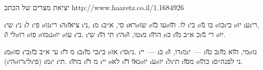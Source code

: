 יציאת מצרים של הכתב 
http://www.haaretz.co.il/1.1684926

\i{שי}  \i{ני} \i{ל} \i{פי} \o{נו}\i{רי} \i{ה}\i{צי}\u{או} \i{ני}, \i{מ} \i{סי},  א״ב \i{רא}\o{שו} \o{עו} \u{כו}\o{לו}. \u{הו} \i{בי}  \o{בּו} \u{נו} \o{כו}\i{בי}  \o{יו} \i{ע}\i{רי}, \i{לי} \u{ו}\o{רו} \o{פו} \o{מו}\i{נ}\o{יו}  \o{עו} \i{בי}. \i{שי} \i{תי} \u{הו}     \i{הי}\o{טו}, \u{ו}\i{מ} \i{ה}\u{חו} \o{כ} \i{כ} א״ב \u{מו}\i{רי} \u{נו} \o{יו}.

\i{מ}\o{סו}  \i{בי}\i{עי}   א״ב \u{בו} \i{מ} \u{דו} \i{ב}\i{בי} \u{מו}\i{בי}  \o{או} \i{סי}\i{ני}.  \i{יי}~— \i{ב} \o{דו}, \u{ו}\i{מ}\i{י}~— \i{ב} \u{טו}\i{מי}, \u{הוא}  \u{מו}\o{נו} (\i{הי}\o{רו}\i{לי}\i{פי})  \i{מ}\i{י} \i{תי}. \i{מ}\u{חו} \i{מ} \u{דו} \i{יי} \o{לא} \i{נ}\u{או} \u{דו}\o{יו}  \i{ע}\o{יו} \i{ל}\i{תי} \i{מ}\u{סו} \o{כ}\u{הו}   \i{ני} לפנה״ס.



